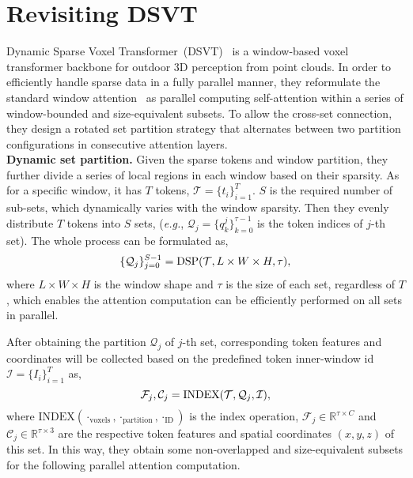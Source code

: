 \documentclass[10pt,twocolumn,letterpaper]{article}
\begin{document}
\section{Revisiting DSVT} \label{sec:revisit}
Dynamic Sparse Voxel Transformer~(DSVT)~\cite{wang2023dsvt} is a window-based voxel transformer backbone for outdoor 3D perception from point clouds. In order to efficiently handle sparse data in a fully parallel manner, they reformulate the standard window attention~\cite{liu2021swin} as parallel computing self-attention within a series of window-bounded and size-equivalent subsets. To allow the cross-set connection, they design a rotated set partition strategy that alternates between two partition configurations in consecutive attention layers. \\
\textbf{Dynamic set partition.} Given the sparse tokens and window partition, they further divide a series of local regions in each window based on their sparsity. As for a specific window, it has $T$ tokens, $\mathcal{T} = \{ t_i\}^T_{i=1}$. $S$ is the required number of sub-sets, which dynamically varies with the window sparsity. Then they evenly distribute $T$ tokens into $S$ sets, (\textit{e.g.}, $\mathcal{Q}_j = \{q^j_k\}^{\tau-1}_{k=0}$ is the token indices of $j$-th set). The whole process can be formulated as,
\vspace{-2pt}
\begin{equation}
  \{\mathcal{Q}_j\}_{j=0}^{S-1} = \text{DSP}(\mathcal{T}, L \times W \times H, \tau),  
  \label{eq:revisit_dsp}
  \vspace{-2pt}
\end{equation}
where $L \times W \times H$ is the window shape and $\tau$ is the size of each set, regardless of $T$, which enables the attention computation can be efficiently performed on all sets in parallel. 

After obtaining the partition $\mathcal{Q}_j$ of $j$-th set, corresponding token features and coordinates will be collected based on the predefined token inner-window id $\mathcal{I} = \{I_i\}_{i=1}^T$ as, 
\vspace{-4pt}
\begin{equation}
  \mathcal{F}_j, \mathcal{C}_j = \text{INDEX}(\mathcal{T}, \mathcal{Q}_j, \mathcal{I}),  
  \label{eq:index}
  \vspace{-4pt}
\end{equation}
where $\text{INDEX}(\cdot _{\text{voxels}}, \cdot _{\text{partition}}, \cdot _{\text{ID}})$ is the index operation, $\mathcal{F}_j \in \mathbb{R}^{\tau \times C}$ and $\mathcal{C}_j \in \mathbb{R}^{\tau \times 3} $ are the respective token features and spatial coordinates  $(x, y, z)$ of this set. In this way, they obtain some non-overlapped and size-equivalent subsets for the following parallel attention computation.  
\end{document}
